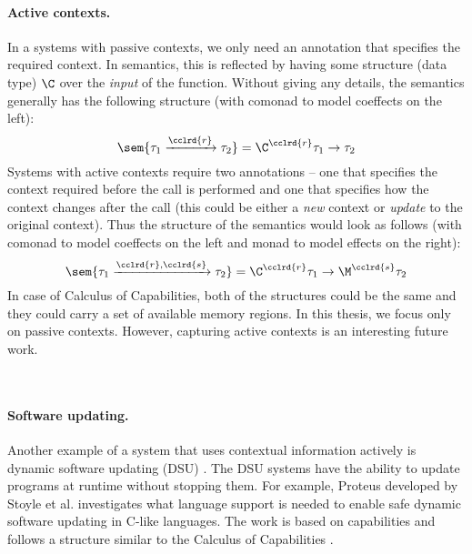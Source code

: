 \paragraph{Active contexts.}
In a systems with passive contexts, we only need an annotation that specifies the required
context. In semantics, this is reflected by having some structure (data type) $\C$ over the
\emph{input} of the function. Without giving any details, the semantics generally has the
following structure (with comonad to model coeffects on the left):
%
\begin{equation*}
\sem{\tau_1 \xrightarrow{\cclrd{r}} \tau_2} = \C^{\cclrd{r}} \tau_1 \rightarrow \tau_2
\end{equation*}
%
Systems with active contexts require two annotations -- one that specifies the context required
before the call is performed and one that specifies how the context changes after the call (this
could be either a \emph{new} context or \emph{update} to the original context). Thus the structure
of the semantics would look as follows (with comonad to model coeffects on the left and monad to
model effects on the right):
%
\begin{equation*}
\sem{\tau_1 \xrightarrow{\cclrd{r}, \cclrd{s}} \tau_2} = \C^{\cclrd{r}} \tau_1 \rightarrow \M^{\cclrd{s}} \tau_2
\end{equation*}
%
In case of Calculus of Capabilities, both of the structures could be the same and they could
carry a set of available memory regions. In this thesis, we focus only on passive contexts.
However, capturing active contexts is an interesting future work.


~

\paragraph{Software updating.}
Another example of a system that uses contextual information actively is dynamic software updating
(DSU) \cite{app-dsu-programs,app-dsu}. The DSU systems have the ability to update programs at
runtime without stopping them. For example, Proteus developed by Stoyle et al. \cite{app-dsu-mutatis}
investigates what language support is needed to enable safe dynamic software updating in C-like
languages. The work is based on capabilities and follows a structure similar to the Calculus
of Capabilities \cite{app-capabilities}.


